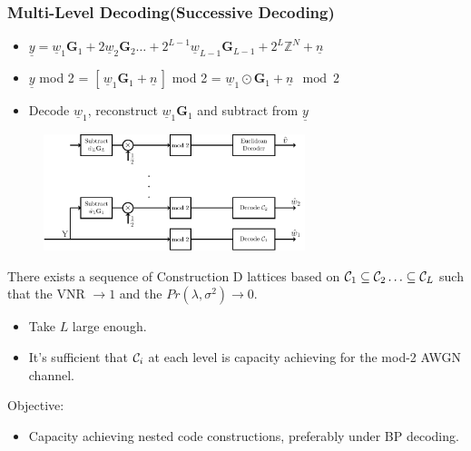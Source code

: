 \documentclass[10pt]{beamer}
\begin{document}
\begin{frame}\frametitle{Multi-Level Decoding(Successive Decoding) }
      \begin{itemize}
        \item $\underline{y} = \boxed{\underline{w}_1 \mathbf{G}_1 + 2 \underline{w}_2 \mathbf{G}_2 \ldots +2^{L-1} \underline{w}_{L-1} \mathbf{G}_{L-1} +2^{L}\mathbb{Z}^{N}} + \underline{n}$
         \vspace{0.05in}	
         \item $\underline{y}$ mod 2 = $ \left[\,\underline{w}_1 \mathbf{G}_1 + \underline{n}\,\right] $ mod 2 = $\underline{w}_1 \odot \mathbf{G}            _1 + \boxed{\underline{n} \mod 2}$
         \vspace{0.05in}
		\item Decode $\underline{w}_1$, reconstruct $\underline{w}_1 \mathbf{G}_1$ and subtract from $\underline{y}$
         \vspace{0.2in}
    \end{itemize}
            \begin{figure}
					\includegraphics[width=3in]{multi_stage_decode}
            \end{figure}
	\end{frame}


\begin{frame}
        \begin{theorem}
There exists a sequence of Construction D lattices based on $\mathcal{C}_{1}\subseteq \mathcal{C}_{2}\ldots \subseteq \mathcal{C}_{L}$ such that the VNR $\rightarrow 1$ and the $Pr(\lambda,\sigma^{2})\rightarrow 0$.
       \end{theorem}

\begin{itemize}
\item Take $L$ large enough.
\item It's sufficient that $\mathcal{C}_{i}$ at each level is capacity achieving for the mod-2 AWGN channel.
\end{itemize}
\pause
\vspace{0.4in}
Objective:
\begin{itemize}
\item Capacity achieving nested code constructions, preferably under BP decoding.
\end{itemize}
\end{frame}
\end{document}
